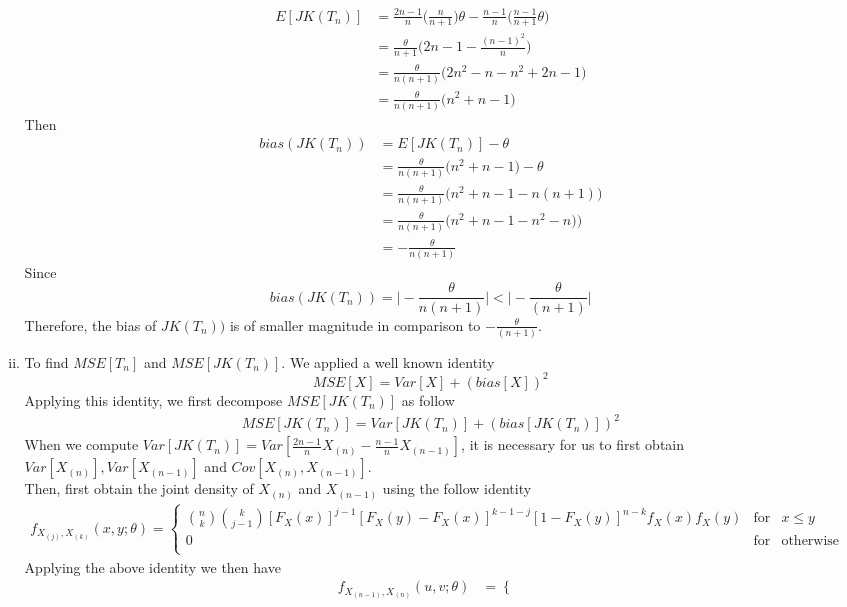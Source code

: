 \documentclass[a4paper,11pt]{article}
\begin{document}
\begin{enumerate}[a)]
\begin{enumerate}[i)]
\begin{align*}
		E[JK(T_n)] &= \frac{2n-1}{n} \bigg( \frac{n}{n+1}\bigg) \theta - \frac{n-1}{n}\bigg(\frac{n-1}{n+1}\theta \bigg)\\
		&= \frac{\theta}{n+1} \bigg(2n-1 - \frac{(n-1)^2}{n}\bigg)\\
		&=  \frac{\theta}{n(n+1)} \bigg(2n^2-n - n^2+2n -1\bigg)\\
		&= \frac{\theta}{n(n+1)} \bigg(n^2+n-1\bigg)
	\end{align*}
	Then
	\begin{align*}
		bias(JK(T_n))&=E[JK(T_n)]-\theta \\
		&= \frac{\theta}{n(n+1)} \bigg(n^2+n-1\bigg) - \theta \\
		&=\frac{\theta}{n(n+1)} \bigg(n^2+n-1 - n(n+1)\bigg) \\
		&=\frac{\theta}{n(n+1)} \bigg(n^2+n-1 - n^2-n)\bigg) \\
		&= -\frac{\theta}{n(n+1)}
	\end{align*}
	Since 
	\[
	bias(JK(T_n)) = \bigg|-\frac{\theta}{n(n+1)}\bigg|<\bigg|-\frac{\theta}{(n+1)}\bigg|
	\]
	Therefore, the bias of $JK(T_n))$ is of smaller magnitude in comparison to $-\frac{\theta}{(n+1)}$.
\item
	To find $MSE[T_n]$ and $MSE[JK(T_n)]$. We applied a well known identity
	\[
	MSE[X] = Var[X] +(bias[X])^2
	\]
	Applying this identity, we first decompose $MSE[JK(T_n)]$ as follow
	\begin{align*}
	MSE[JK(T_n)] = Var[JK(T_n)] +(bias[JK(T_n)])^2
	\end{align*}
	When we compute $Var[JK(T_n)] = Var[ \frac{2n-1}{n}X_{(n)} - \frac{n-1}{n}X_{(n-1)}]$, it is necessary for us to first obtain $Var[X_{(n)}] ,Var[X_{(n-1)}]$ and $Cov[X_{(n)},X_{(n-1)}]$.\\
	Then, first obtain the joint density of $X_{(n)}$ and $X_{(n-1)}$ using the follow identity
	\begin{align*}	
	f_{X_{(j)},X_{(k)}}(x,y;\theta) =  \left\{ 
				\begin{array}{rcl}
				\binom{n}{k}\binom{k}{j-1}[F_X(x)]^{j-1}[F_X(y)-F_X(x)]^{k-1-j}[1-F_X(y)]^{n-k}f_X(x)f_X(y)& \mbox{for}
				& x\le y \\ 0 & \mbox{for} & \mbox{otherwise} \\
				\end{array}\right.
	\end{align*}
	Applying the above identity we then have
	\begin{align*}	
	f_{X_{(n-1)},X_{(n)}}(u,v;\theta) &=  \left\{ 
				\begin{array}{rcl}

\end{array}
\end{align*}
\end{enumerate}
\end{enumerate}
\end{document}
